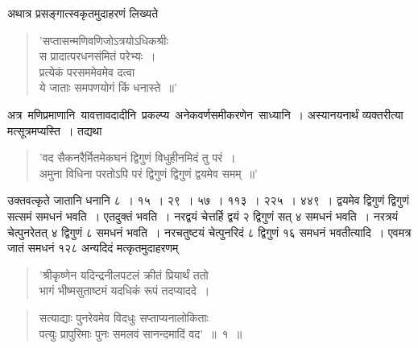 \documentclass[11pt, openany]{book}
\begin{document}
\vspace{-3mm}
 अथात्र प्रसङ्गात्स्वकृतमुदाहरणं लिख्यते\textendash 
\begin{quote}
    \qt
 'सप्तासन्मणिवणिजोऽत्रयोऽधिकश्रीः \\

\vspace{-7mm}
\hspace{1cm} स प्रादात्परधनसंमितं परेभ्यः~। \\

\vspace{-7mm}
\hspace{0.5mm} प्रत्येकं परसममेवमेव दत्वा \\

\vspace{-7mm}
\hspace{1cm} ये जाताः समपणयोगं किं धनास्ते~॥'
\end{quote}

 अत्र \,मणिप्रमाणानि \,यावत्तावदादीनि \,प्रकल्प्य \,अनेकवर्णसमीकरणेन \,साध्यानि~। अस्यानयनार्थं व्यक्तरीत्या मत्सूत्रमप्यस्ति~। तद्यथा\textendash 
\begin{quote}
    \qt
      'वद सैकनरैर्मितमेकघनं द्विगुणं विधुहीनमिदं तु परं~। \\
 अमुना विधिना परतोऽपि परं द्विगुणं द्विगुणं द्वयमेव समम्~॥'
\end{quote}

 उक्तवत्कृते जातानि धनानि ८~। १५~। २९~। ५७~। ११३~। 
२२५~। ४४९~। द्वयमेव द्विगुणं द्विगुणं सत्समं समधनं भवति~। एतदुक्तं 
भवति~। नरद्वयं चेत्तर्हि द्वयं २ द्विगुणं सत् ४ समधनं भवति~। 
नरत्रयं चेत्पुनरेतत् ४ द्विगुणं ८ समधनं भवति~। नरचतुष्टयं चेत्पुनरिदं 
८ द्विगुणं १६ समधनं भवतीत्यादि~। एवमत्र जातं समधनं १२८ अन्यदिदं 
मत्कृतमुदाहरणम्\textendash 
\begin{quote}
    \qt
 'श्रीकृष्णेन यदिन्द्रनीलपटलं क्रीतं प्रियार्थं ततो \\

\vspace{-7mm}
\hspace{1cm} भागं भीष्मसुताष्टमं यदधिकं रूपं तदप्याददे~।
 \end{quote}
\newpage%
\begin{quote}
    \qt
     सत्याद्याः पुनरेवमेव विदधुः सप्ताप्यनालोकिताः \\

\vspace{-7mm}
\hspace{1cm} पत्युः प्रापुरिमाः पुनः समलवं सानन्दमादिं वद'~॥~१~॥~
\end{quote}
\end{document}
